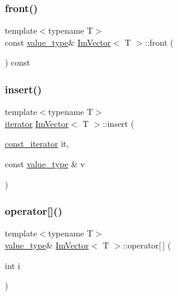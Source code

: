 \mbox{\label{class_im_vector_a76dc6bb045574ba79b15a1941b662597}} 
\subsubsection{\texorpdfstring{front()}{front()}\hspace{0.1cm}{\footnotesize\ttfamily [2/2]}}
{\footnotesize\ttfamily template$<$typename T$>$ \\
const \mbox{\hyperlink{class_im_vector_a8bd77e4e7581d8e5f9e98d7c2f3c2a80}{value\+\_\+type}}\& \mbox{\hyperlink{class_im_vector}{Im\+Vector}}$<$ T $>$\+::front (\begin{DoxyParamCaption}{ }\end{DoxyParamCaption}) const\hspace{0.3cm}{\ttfamily [inline]}}

\mbox{\label{class_im_vector_a52fdb731c13c82a1fd971186c6a701b5}} 
\subsubsection{\texorpdfstring{insert()}{insert()}}
{\footnotesize\ttfamily template$<$typename T$>$ \\
\mbox{\hyperlink{class_im_vector_a74b5478f1f6fd471cc71219bce483db6}{iterator}} \mbox{\hyperlink{class_im_vector}{Im\+Vector}}$<$ T $>$\+::insert (\begin{DoxyParamCaption}\item[{\mbox{\hyperlink{class_im_vector_aedeac9c5080f9d6ce96ae837768ee4c4}{const\+\_\+iterator}}}]{it,  }\item[{const \mbox{\hyperlink{class_im_vector_a8bd77e4e7581d8e5f9e98d7c2f3c2a80}{value\+\_\+type}} \&}]{v }\end{DoxyParamCaption})\hspace{0.3cm}{\ttfamily [inline]}}

\mbox{\label{class_im_vector_a59a3eeadda07579727de93ca6844b91e}} 
\subsubsection{\texorpdfstring{operator[]()}{operator[]()}\hspace{0.1cm}{\footnotesize\ttfamily [1/2]}}
{\footnotesize\ttfamily template$<$typename T$>$ \\
\mbox{\hyperlink{class_im_vector_a8bd77e4e7581d8e5f9e98d7c2f3c2a80}{value\+\_\+type}}\& \mbox{\hyperlink{class_im_vector}{Im\+Vector}}$<$ T $>$\+::operator\mbox{[}$\,$\mbox{]} (\begin{DoxyParamCaption}\item[{int}]{i }\end{DoxyParamCaption})\hspace{0.3cm}{\ttfamily [inline]}}

